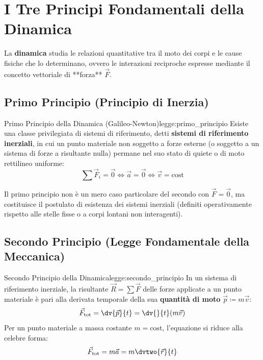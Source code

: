 \vspace{0.5em}

\section{I Tre Principi Fondamentali della Dinamica}
\label{sec:principi_newton}

La \textbf{dinamica} studia le relazioni quantitative tra il moto dei corpi e le cause fisiche che lo determinano, ovvero le interazioni reciproche espresse mediante il concetto vettoriale di **forza** $\vec{F}$.

\subsection{Primo Principio (Principio di Inerzia)}

\begin{legge}{Primo Principio della Dinamica (Galileo-Newton)}{legge:primo_principio}
Esiste una classe privilegiata di sistemi di riferimento, detti \textbf{sistemi di riferimento inerziali}, in cui un punto materiale non soggetto a forze esterne (o soggetto a un sistema di forze a risultante nulla) permane nel suo stato di quiete o di moto rettilineo uniforme:
\begin{equation}
    \sum \vec{F}_i = \vec{0} \iff \vec{a} = \vec{0} \iff \vec{v} = \text{cost}
\end{equation}
\end{legge}

\begin{osservazione}
Il primo principio non è un mero caso particolare del secondo con $\vec{F}=\vec{0}$, ma costituisce il postulato di esistenza dei sistemi inerziali (definiti operativamente rispetto alle stelle fisse o a corpi lontani non interagenti).
\end{osservazione}

\subsection{Secondo Principio (Legge Fondamentale della Meccanica)}

\begin{legge}{Secondo Principio della Dinamica}{legge:secondo_principio}
In un sistema di riferimento inerziale, la risultante $\vec{R} = \sum \vec{F}$ delle forze applicate a un punto materiale è pari alla derivata temporale della sua \textbf{quantità di moto} $\vec{p} \coloneqq m\vec{v}$:
\begin{equation}
    \vec{F}_{\text{tot}} = \dv{\vec{p}}{t} = \dv{}{t}(m\vec{v})
    \label{eq:secondo_principio_gen}
\end{equation}
Per un punto materiale a massa costante $m = \text{cost}$, l'equazione si riduce alla celebre forma:
\begin{equation}
    \vec{F}_{\text{tot}} = m\vec{a} = m\dvtwo{\vec{r}}{t}
    \label{eq:f_ma}
\end{equation}
\end{legge}

